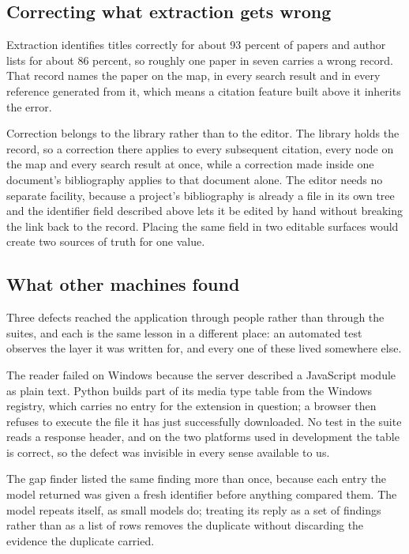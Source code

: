 \documentclass[12pt,a4paper]{report}
\begin{document}
\subsection{Correcting what extraction gets wrong}

Extraction identifies titles correctly for about 93 percent of papers and
author lists for about 86 percent, so roughly one paper in seven carries a
wrong record. That record names the paper on the map, in every search result
and in every reference generated from it, which means a citation feature built
above it inherits the error.

Correction belongs to the library rather than to the editor. The library holds
the record, so a correction there applies to every subsequent citation, every
node on the map and every search result at once, while a correction made inside
one document's bibliography applies to that document alone. The editor needs no
separate facility, because a project's bibliography is already a file in its own
tree and the identifier field described above lets it be edited by hand without
breaking the link back to the record. Placing the same field in two editable
surfaces would create two sources of truth for one value.

\subsection{What other machines found}

Three defects reached the application through people rather than through the
suites, and each is the same lesson in a different place: an automated test
observes the layer it was written for, and every one of these lived somewhere
else.

The reader failed on Windows because the server described a JavaScript module
as plain text. Python builds part of its media type table from the Windows
registry, which carries no entry for the extension in question; a browser then
refuses to execute the file it has just successfully downloaded. No test in the
suite reads a response header, and on the two platforms used in development the
table is correct, so the defect was invisible in every sense available to us.

The gap finder listed the same finding more than once, because each entry the
model returned was given a fresh identifier before anything compared them. The
model repeats itself, as small models do; treating its reply as a set of
findings rather than as a list of rows removes the duplicate without discarding
the evidence the duplicate carried.
\end{document}
